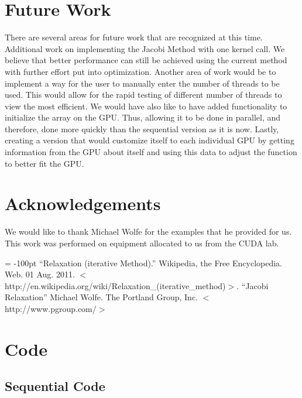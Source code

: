 \documentclass[10pt]{article}
\begin{document}
\begin{multicols}{2}
  \section{Future Work} %
  There are several areas for future work that are recognized at this time.
  Additional work on implementing the Jacobi Method with one kernel call.
  We believe that better performance can still be achieved using the current method with further effort put into optimization.
  Another area of work would be to implement a way for the user to manually enter the number of threads to be used.
  This would allow for the rapid testing of different number of threads to view the most efficient.
  We would have also like to have added functionality to initialize the array on the GPU.
  Thus, allowing it to be done in parallel, and therefore, done more quickly than the sequential version as it is now.
  Lastly, creating a version that would customize itself to each individual GPU by getting information from the GPU about itself and using this data to adjust the function to better fit the GPU.

  \section{Acknowledgements} %
  We would like to thank Michael Wolfe for the examples that he provided for us.
  This work was performed on equipment allocated to us from the CUDA lab.

\end{multicols}

\begin{flushleft}
  \begin{thebibliography}{99}
      \topmargin = -100pt
    ``Relaxation (iterative Method).''
      Wikipedia, the Free Encyclopedia. Web. 01 Aug. 2011. $<$http://en.wikipedia.org/wiki/Relaxation\_(iterative\_method)$>$.
    ``Jacobi Relaxation''
      Michael Wolfe. The Portland Group, Inc. $<$http://www.pgroup.com/$>$
  \end{thebibliography}
\end{flushleft}

\clearpage

\appendix
\section{Code}

\subsection{Sequential Code}
\inputminted[linenos, fontsize=\footnotesize]{c}{../jacobi_final/seq_jacobi.c}
\end{document}
